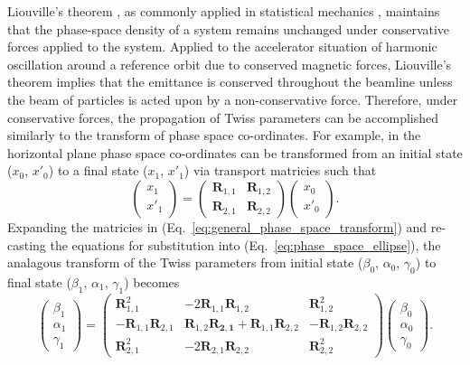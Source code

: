 \documentclass[../main.tex]{subfiles}
\begin{document}
Liouville's theorem \cite{liouville1838note}, as commonly applied in statistical mechanics \cite{gibbs1902elementary}, maintains that the phase-space density of a system remains unchanged under conservative forces applied to the system. Applied to the accelerator situation of harmonic oscillation around a reference orbit due to conserved magnetic forces, Liouville's theorem implies that the emittance is conserved throughout the beamline unless the beam of particles is acted upon by a non-conservative force. Therefore, under conservative forces, the propagation of Twiss parameters can be accomplished similarly to the transform of phase space co-ordinates. For example, in the horizontal plane phase space co-ordinates can be transformed from an initial state ($x_{0}$, $x'_{0}$) to a final state ($x_{1}$, $x'_{1}$) via transport matricies such that
\begin{equation}
\begin{pmatrix}
x_{1} \\
x'_{1}
\end{pmatrix}
=
\begin{pmatrix}
\boldsymbol{R}_{1,1} & \boldsymbol{R}_{1,2} \\
\boldsymbol{R}_{2,1} & \boldsymbol{R}_{2,2}
\end{pmatrix}
\begin{pmatrix}
x_{0} \\
x'_{0}
\end{pmatrix}.
\label{eq:general_phase_space_transform}
\end{equation}
Expanding the matricies in (Eq.~\ref{eq:general_phase_space_transform}) and re-casting the equations for substitution into (Eq.~\ref{eq:phase_space_ellipse}), the analagous transform of the Twiss parameters from initial state ($\beta_{0}$, $\alpha_{0}$, $\gamma_{0}$) to final state ($\beta_{1}$, $\alpha_{1}$, $\gamma_{1}$) becomes 
\begin{equation}
\begin{pmatrix}
\beta_{1} \\
\alpha_{1} \\
\gamma_{1} 
\end{pmatrix}
=
\begin{pmatrix}
\boldsymbol{R}_{1,1}^{2} & -2\boldsymbol{R}_{1,1}\boldsymbol{R}_{1,2} & \boldsymbol{R}_{1,2}^{2} \\
-\boldsymbol{R}_{1,1}\boldsymbol{R}_{2,1} & \boldsymbol{R}_{1,2}\boldsymbol{R_{2,1}}+\boldsymbol{R}_{1,1}\boldsymbol{R}_{2,2} & -\boldsymbol{R}_{1,2}\boldsymbol{R}_{2,2} \\
\boldsymbol{R}_{2,1}^{2} & -2\boldsymbol{R}_{2,1}\boldsymbol{R}_{2,2} & \boldsymbol{R}_{2,2}^{2} 
\end{pmatrix}
\begin{pmatrix}
\beta_{0} \\
\alpha_{0} \\
\gamma_{0}
\end{pmatrix}.
\label{eq:general_Twiss_transform}
\end{equation}
\end{document}
